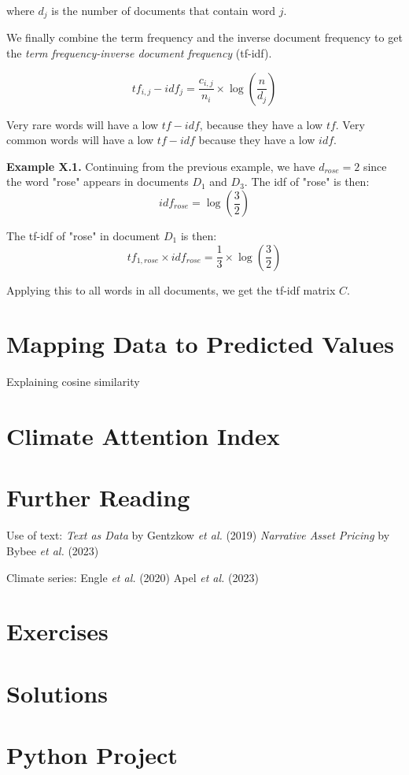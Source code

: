 where $d_j$ is the number of documents that contain word $j$.

We finally combine the term frequency and the inverse document frequency
to get the \textit{term frequency-inverse document frequency} (tf-idf).

\begin{equation}
tf_{i,j} - idf_{j} = \frac{c_{i,j}}{n_i} \times \log (\frac{n}{d_j})
\end{equation}

Very rare words will have a low $tf-idf$, because
they have a low $tf$. Very common words 
will have a low $tf-idf$ because they have a low $idf$.

\begin{examplebox}
    \textbf{Example X.1.} 
    Continuing from the previous example,
    we have $d_{rose} = 2$ since the word "rose" appears in
    documents $D_1$ and $D_3$.
    The idf of "rose" is then:
    \begin{equation}
        idf_{rose} = \log (\frac{3}{2})
    \end{equation}

    The tf-idf of "rose" in document $D_1$ is then:
    \begin{equation}
        tf_{1,rose} \times idf_{rose} = \frac{1}{3} \times \log (\frac{3}{2})
    \end{equation}

    Applying this to all words in all documents, we get the tf-idf matrix $C$.

\end{examplebox}

\section{Mapping Data to Predicted Values}

Explaining cosine similarity




\section{Climate Attention Index}


\section{Further Reading}
Use of text:
\textit{Text as Data} by Gentzkow \textit{et al.} (2019) \cite{gentzkow2019text}
\textit{Narrative Asset Pricing} by Bybee \textit{et al.} (2023) \cite{bybee2023narrative}

Climate series:
Engle \textit{et al.} (2020) \cite{engle2020hedging}
Apel \textit{et al.} (2023) \cite{apel2023real}
\section{Exercises}

\section{Solutions}

\section{Python Project}


